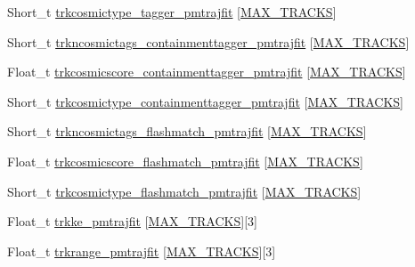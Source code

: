 \begin{DoxyCompactItemize}
\item 
Short\-\_\-t \hyperlink{classanatree_a3a0d3b5fb1121118014b0d2a8387ba6a}{trkcosmictype\-\_\-tagger\-\_\-pmtrajfit} \mbox{[}\hyperlink{anatree__core__v09410002__orig_8h_a327fd4e796e4a0d78947524c96e4362e}{M\-A\-X\-\_\-\-T\-R\-A\-C\-K\-S}\mbox{]}
\item 
Short\-\_\-t \hyperlink{classanatree_a945d06e2aea5a57ae7600e817bc63d0f}{trkncosmictags\-\_\-containmenttagger\-\_\-pmtrajfit} \mbox{[}\hyperlink{anatree__core__v09410002__orig_8h_a327fd4e796e4a0d78947524c96e4362e}{M\-A\-X\-\_\-\-T\-R\-A\-C\-K\-S}\mbox{]}
\item 
Float\-\_\-t \hyperlink{classanatree_a6ee81f915805ae5633a43b086caae9f2}{trkcosmicscore\-\_\-containmenttagger\-\_\-pmtrajfit} \mbox{[}\hyperlink{anatree__core__v09410002__orig_8h_a327fd4e796e4a0d78947524c96e4362e}{M\-A\-X\-\_\-\-T\-R\-A\-C\-K\-S}\mbox{]}
\item 
Short\-\_\-t \hyperlink{classanatree_a7d9cde811e1a0d9d10fa4ac1994c0bdc}{trkcosmictype\-\_\-containmenttagger\-\_\-pmtrajfit} \mbox{[}\hyperlink{anatree__core__v09410002__orig_8h_a327fd4e796e4a0d78947524c96e4362e}{M\-A\-X\-\_\-\-T\-R\-A\-C\-K\-S}\mbox{]}
\item 
Short\-\_\-t \hyperlink{classanatree_ae7727401f92f393835e0334fc0850c92}{trkncosmictags\-\_\-flashmatch\-\_\-pmtrajfit} \mbox{[}\hyperlink{anatree__core__v09410002__orig_8h_a327fd4e796e4a0d78947524c96e4362e}{M\-A\-X\-\_\-\-T\-R\-A\-C\-K\-S}\mbox{]}
\item 
Float\-\_\-t \hyperlink{classanatree_aecde2939d264e5639b7c8e42c8a16a1c}{trkcosmicscore\-\_\-flashmatch\-\_\-pmtrajfit} \mbox{[}\hyperlink{anatree__core__v09410002__orig_8h_a327fd4e796e4a0d78947524c96e4362e}{M\-A\-X\-\_\-\-T\-R\-A\-C\-K\-S}\mbox{]}
\item 
Short\-\_\-t \hyperlink{classanatree_a89eb9920378b0313fbf2d039b42775f9}{trkcosmictype\-\_\-flashmatch\-\_\-pmtrajfit} \mbox{[}\hyperlink{anatree__core__v09410002__orig_8h_a327fd4e796e4a0d78947524c96e4362e}{M\-A\-X\-\_\-\-T\-R\-A\-C\-K\-S}\mbox{]}
\item 
Float\-\_\-t \hyperlink{classanatree_a94f1ca3c3ca4622536802ffc7384bf37}{trkke\-\_\-pmtrajfit} \mbox{[}\hyperlink{anatree__core__v09410002__orig_8h_a327fd4e796e4a0d78947524c96e4362e}{M\-A\-X\-\_\-\-T\-R\-A\-C\-K\-S}\mbox{]}\mbox{[}3\mbox{]}
\item 
Float\-\_\-t \hyperlink{classanatree_afab9c71811a62f2f898df45a87ed3ecd}{trkrange\-\_\-pmtrajfit} \mbox{[}\hyperlink{anatree__core__v09410002__orig_8h_a327fd4e796e4a0d78947524c96e4362e}{M\-A\-X\-\_\-\-T\-R\-A\-C\-K\-S}\mbox{]}\mbox{[}3\mbox{]}

\end{DoxyCompactItemize}
